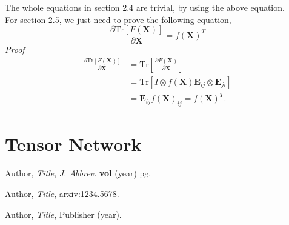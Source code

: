 \documentclass[a4paper,11pt]{article}
\def\tr{\mathrm{Tr}}
\def\m#1{\mathbf{#1}}
\begin{document}
The whole equations in section 2.4 are trivial, by using the above equation.\\

For section 2.5, we just need to prove the following equation,
\begin{equation}
    \frac{\partial \tr[F(\m X)]}{\partial \m X} = f(\m X)^T
\end{equation}
\emph{Proof}
\begin{align}
    \frac{\partial \tr[F(\m X)]}{\partial \m X} & = \tr[\frac{\partial F(\m X)}{\partial \m X}] \\ & = \tr[I \otimes f(\m X) \m E_{ij} \otimes \m E_{ji}] \\ & = \m E_{ij} f(\m X)_{ij} = f(\m X)^T.
\end{align}

\appendix
\label{app:tn}
\section{Tensor Network}

\begin{thebibliography}{99}

Author, \emph{Title}, \emph{J. Abbrev.} {\bf vol} (year) pg.

Author, \emph{Title},
arxiv:1234.5678.

Author, \emph{Title},
Publisher (year).





\end{thebibliography}
\end{document}
